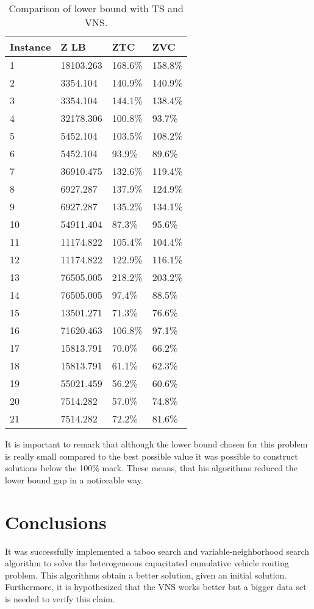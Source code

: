 \documentclass[10pt,twoside]{article}
\begin{document}
\begin{table}[]
\centering
\begin{tabular}{llll}
\hline
Instance & Z LB      & ZTC     & ZVC     \\ \hline
1        & 18103.263 & 168.6\% & 158.8\% \\
2        & 3354.104  & 140.9\% & 140.9\% \\
3        & 3354.104  & 144.1\% & 138.4\% \\
4        & 32178.306 & 100.8\% & 93.7\%  \\
5        & 5452.104  & 103.5\% & 108.2\% \\
6        & 5452.104  & 93.9\%  & 89.6\%  \\
7        & 36910.475 & 132.6\% & 119.4\% \\
8        & 6927.287  & 137.9\% & 124.9\% \\
9        & 6927.287  & 135.2\% & 134.1\% \\
10       & 54911.404 & 87.3\%  & 95.6\%  \\
11       & 11174.822 & 105.4\% & 104.4\% \\
12       & 11174.822 & 122.9\% & 116.1\% \\
13       & 76505.005 & 218.2\% & 203.2\% \\
14       & 76505.005 & 97.4\%  & 88.5\%  \\
15       & 13501.271 & 71.3\%  & 76.6\%  \\
16       & 71620.463 & 106.8\% & 97.1\%  \\
17       & 15813.791 & 70.0\%  & 66.2\%  \\
18       & 15813.791 & 61.1\%  & 62.3\%  \\
19       & 55021.459 & 56.2\%  & 60.6\%  \\
20       & 7514.282  & 57.0\%  & 74.8\%  \\
21       & 7514.282  & 72.2\%  & 81.6\%  \\ \hline
\end{tabular}
\caption{Comparison of lower bound with TS and VNS.}
\label{tab:lbc}
\end{table}

It is important to remark that although the lower bound chosen for
this problem is really small compared to the best possible value it
was possible to construct solutions below the 100\% mark. These means,
that his algorithms reduced the lower bound gap in a noticeable way.

\section{Conclusions}\label{sec_conclusions}
It was successfully implemented a taboo search and
variable-neighborhood search algorithm to solve the heterogeneous
capacitated cumulative vehicle routing problem. This algorithms obtain
a better solution, given an initial solution. Furthermore, it is
hypothesized that the VNS works better but a bigger data set is needed
to verify this claim.

{\small


}
\end{document}

